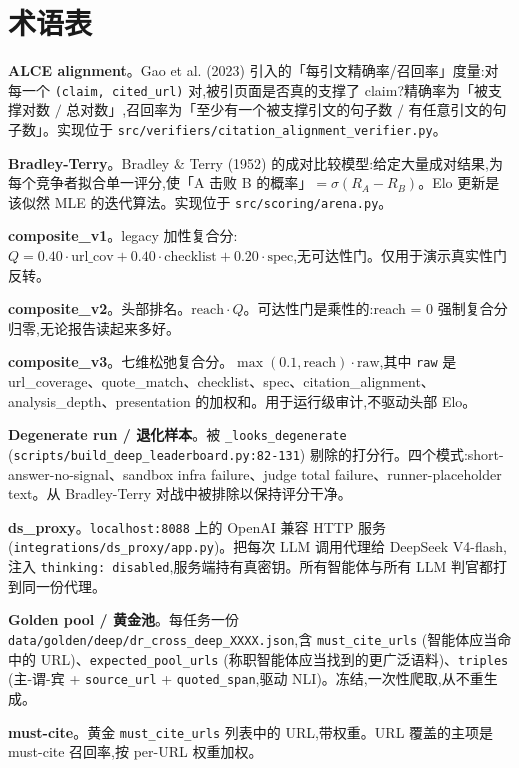 \documentclass[UTF8,a4paper,12pt,oneside]{ctexart}
\begin{document}
\section{术语表}

\sloppy

\textbf{ALCE alignment}。Gao et al. (2023) 引入的「每引文精确率/召回率」度量:对每一个 \texttt{(claim, cited\_url)} 对,被引页面是否真的支撑了 claim?精确率为「被支撑对数 \(/\) 总对数」,召回率为「至少有一个被支撑引文的句子数 \(/\) 有任意引文的句子数」。实现位于 \texttt{src/verifiers/citation\_alignment\_verifier.py}。

\textbf{Bradley-Terry}。Bradley \& Terry (1952) 的成对比较模型:给定大量成对结果,为每个竞争者拟合单一评分,使「A 击败 B 的概率」\(= \sigma(R_A - R_B)\)。Elo 更新是该似然 MLE 的迭代算法。实现位于 \texttt{src/scoring/arena.py}。

\textbf{composite\_v1}。legacy 加性复合分:\(Q = 0.40 \cdot \text{url\_cov} + 0.40 \cdot \text{checklist} + 0.20 \cdot \text{spec}\),无可达性门。仅用于演示真实性门反转。

\textbf{composite\_v2}。头部排名。\(\text{reach} \cdot Q\)。可达性门是乘性的:reach = 0 强制复合分归零,无论报告读起来多好。

\textbf{composite\_v3}。七维松弛复合分。\(\max(0.1, \text{reach}) \cdot \text{raw}\),其中 \texttt{raw} 是 url\_coverage、quote\_match、checklist、spec、citation\_alignment、analysis\_depth、presentation 的加权和。用于运行级审计,不驱动头部 Elo。

\textbf{Degenerate run / 退化样本}。被 \texttt{\_looks\_degenerate} (\texttt{scripts/build\_deep\_leaderboard.py:82-131}) 剔除的打分行。四个模式:short-answer-no-signal、sandbox infra failure、judge total failure、runner-placeholder text。从 Bradley-Terry 对战中被排除以保持评分干净。

\textbf{ds\_proxy}。\texttt{localhost:8088} 上的 OpenAI 兼容 HTTP 服务 (\texttt{integrations/ds\_proxy/app.py})。把每次 LLM 调用代理给 DeepSeek V4-flash,注入 \texttt{thinking: disabled},服务端持有真密钥。所有智能体与所有 LLM 判官都打到同一份代理。

\textbf{Golden pool / 黄金池}。每任务一份 \texttt{data/golden/deep/dr\_cross\_deep\_XXXX.json},含 \texttt{must\_cite\_urls} (智能体应当命中的 URL)、\texttt{expected\_pool\_urls} (称职智能体应当找到的更广泛语料)、\texttt{triples} (主-谓-宾 + \texttt{source\_url} + \texttt{quoted\_span},驱动 NLI)。冻结,一次性爬取,从不重生成。

\textbf{must-cite}。黄金 \texttt{must\_cite\_urls} 列表中的 URL,带权重。URL 覆盖的主项是 must-cite 召回率,按 per-URL 权重加权。
\end{document}
